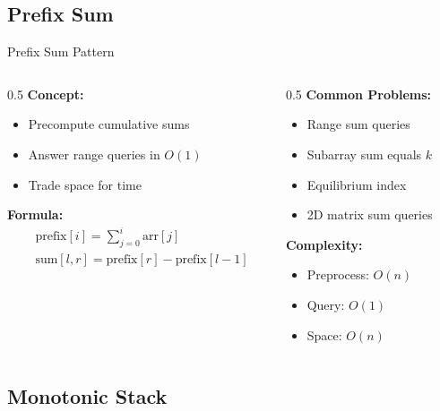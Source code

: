 \documentclass[aspectratio=169,xcolor=dvipsnames]{beamer}
\begin{document}
\subsection{Prefix Sum}

\begin{frame}{Prefix Sum Pattern}
  \begin{columns}
    \begin{column}{0.5\textwidth}
      \textbf{Concept:}
      \begin{itemize}
        \item Precompute cumulative sums
        \item Answer range queries in $O(1)$
        \item Trade space for time
      \end{itemize}

      \vspace{0.3cm}
      \textbf{Formula:}
      \begin{align*}
        &\text{prefix}[i] = \sum_{j=0}^{i} \text{arr}[j] \\
        &\text{sum}[l, r] = \text{prefix}[r] - \text{prefix}[l-1]
      \end{align*}
    \end{column}

    \begin{column}{0.5\textwidth}
      \textbf{Common Problems:}
      \begin{itemize}
        \item Range sum queries
        \item Subarray sum equals $k$
        \item Equilibrium index
        \item 2D matrix sum queries
      \end{itemize}

      \vspace{0.3cm}
      \textbf{Complexity:}
      \begin{itemize}
        \item Preprocess: $O(n)$
        \item Query: $O(1)$
        \item Space: $O(n)$
      \end{itemize}
    \end{column}
  \end{columns}
\end{frame}

\subsection{Monotonic Stack}
\end{document}
